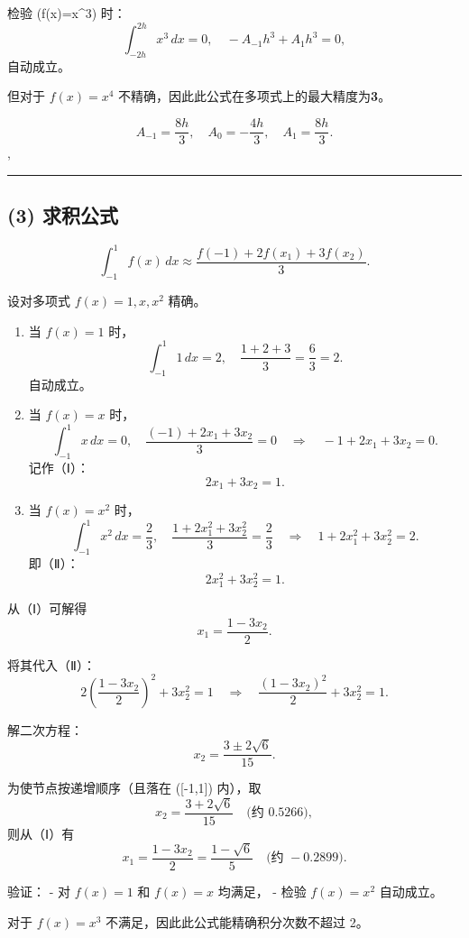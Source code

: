 \documentclass[11pt]{article}
\begin{document}
检验 (f(x)=x\^{}3) 时： \[
\int_{-2h}^{2h}x^3\,dx=0,\quad
-A_{-1}h^3+A_1h^3=0,
\] 自动成立。

但对于 \(f(x)=x^4\) 不精确，因此此公式在多项式上的最大精度为\textbf{3}。

\[\boxed{
A_{-1}=\dfrac{8h}{3},\quad A_0=-\dfrac{4h}{3},\quad A_1=\dfrac{8h}{3}.}
\],

\begin{center}\rule{0.5\linewidth}{0.5pt}\end{center}

\subsection{(3) 求积公式}\label{ux6c42ux79efux516cux5f0f-1}

\[
\int_{-1}^1 f(x)\,dx \approx \frac{f(-1)+2f(x_1)+3f(x_2)}{3}.
\]

设对多项式 \(f(x)=1, x, x^2\) 精确。

\begin{enumerate}
\def\labelenumi{\arabic{enumi}.}
\item
  当 \(f(x)=1\) 时， \[
  \int_{-1}^1 1\,dx =2,\quad \frac{1+2+3}{3}=\frac{6}{3}=2.
  \] 自动成立。
\item
  当 \(f(x)=x\) 时， \[
  \int_{-1}^1 x\,dx =0,\quad
  \frac{(-1)+2x_1+3x_2}{3}=0 \quad\Longrightarrow\quad -1+2x_1+3x_2=0.
  \] 记作（Ⅰ）：\\
  \[
  2x_1+3x_2=1.
  \]
\item
  当 \(f(x)=x^2\) 时， \[
  \int_{-1}^1 x^2\,dx = \frac{2}{3},\quad
  \frac{1+2x_1^2+3x_2^2}{3}=\frac{2}{3}\quad\Longrightarrow\quad 1+2x_1^2+3x_2^2=2.
  \] 即（Ⅱ）： \[
  2x_1^2+3x_2^2=1.
  \]
\end{enumerate}

从（Ⅰ）可解得 \[
x_1=\frac{1-3x_2}{2}.
\]

将其代入（Ⅱ）： \[
2\left(\frac{1-3x_2}{2}\right)^2+3x_2^2=1
\quad\Longrightarrow\quad \frac{(1-3x_2)^2}{2}+3x_2^2=1.
\]

解二次方程： \[
x_2=\frac{3\pm2\sqrt{6}}{15}.
\]

为使节点按递增顺序（且落在 ({[}-1,1{]}) 内），取 \[
x_2=\frac{3+2\sqrt{6}}{15}\quad\text{(约 }0.5266\text{)},
\] 则从（Ⅰ）有 \[
x_1=\frac{1-3x_2}{2}=\frac{1-\sqrt{6}}{5}\quad\text{(约 }-0.2899\text{)}.
\]

验证： - 对 \(f(x)=1\) 和 \(f(x)=x\) 均满足， - 检验 \(f(x)=x^2\)
自动成立。

对于 \(f(x)=x^3\) 不满足，因此此公式能精确积分次数不超过 2。
\end{document}
